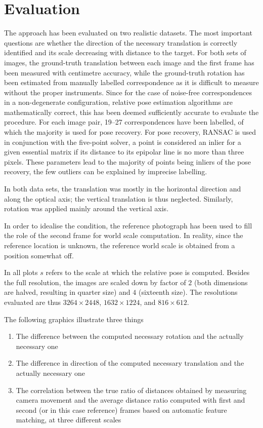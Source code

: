 \chapter{Evaluation}
\label{ch:evaluation}

The approach has been evaluated on two realistic datasets. The most important
questions are whether the direction of the necessary translation is correctly
identified and its scale decreasing with distance to the target.
For both sets of images, the ground-truth translation between each image and the
first frame has been measured with centimetre accuracy, while the ground-truth
rotation has been estimated from manually labelled correspondence as it is
difficult to measure without the proper instruments. Since for the case of
noise-free correspondences in a non-degenerate configuration, relative pose
estimation algorithms are mathematically correct, this has been deemed
sufficiently accurate to evaluate the procedure. For each image pair, 19--27
correspondences have been labelled, of which the majority is used for pose
recovery. For pose recovery, RANSAC is used in conjunction with the five-point
solver, a point is considered an inlier for a given essential matrix if its
distance to its epipolar line is no more than three pixels. These parameters
lead to the majority of points being inliers of the pose recovery, the few
outliers can be explained by imprecise labelling.

In both data sets, the translation was mostly in the horizontal direction and
along the optical axis; the vertical translation is thus neglected. Similarly,
rotation was applied mainly around the vertical axis.

In order to idealise the condition, the reference photograph has been used to
fill the role of the second frame for world scale computation. In reality, since
the reference location is unknown, the reference world scale is obtained from a
position somewhat off.

In all plots $s$ refers to the scale at which the relative pose is computed.
Besides the full resolution, the images are scaled down by factor of $2$ (both
dimensions are halved, resulting in quarter size) and $4$ (sixteenth size). The
resolutions evaluated are thus $3264\times2448$, $1632\times1224$, and
$816\times612$.

The following graphics illustrate three things
\begin{enumerate}
   \item The difference between the computed necessary rotation and the actually
      necessary one
   \item The difference in direction of the computed necessary translation and
      the actually necessary one
   \item The correlation between the true ratio of distances obtained by
      measuring camera movement and the average distance ratio computed with first
      and second (or in this case reference) frames based on automatic feature matching, at
      three different scales
\end{enumerate}

